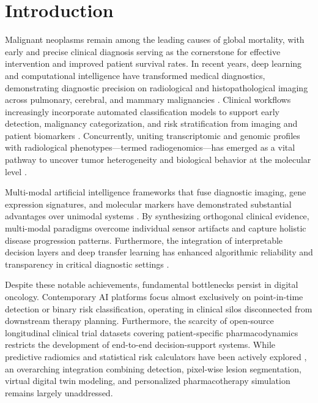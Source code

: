\documentclass[conference]{IEEEtran}
\begin{document}
\section{Introduction}
Malignant neoplasms remain among the leading causes of global mortality, with early and precise clinical diagnosis serving as the cornerstone for effective intervention and improved patient survival rates. In recent years, deep learning and computational intelligence have transformed medical diagnostics, demonstrating diagnostic precision on radiological and histopathological imaging across pulmonary, cerebral, and mammary malignancies \cite{shweikeh2026, uniyal2026, lang2026}. Clinical workflows increasingly incorporate automated classification models to support early detection, malignancy categorization, and risk stratification from imaging and patient biomarkers \cite{yao2025, xu2025, abe2025}. Concurrently, uniting transcriptomic and genomic profiles with radiological phenotypes---termed radiogenomics---has emerged as a vital pathway to uncover tumor heterogeneity and biological behavior at the molecular level \cite{wang2025, oghenekaro2025}.

Multi-modal artificial intelligence frameworks that fuse diagnostic imaging, gene expression signatures, and molecular markers have demonstrated substantial advantages over unimodal systems \cite{slobodzian2025}. By synthesizing orthogonal clinical evidence, multi-modal paradigms overcome individual sensor artifacts and capture holistic disease progression patterns. Furthermore, the integration of interpretable decision layers and deep transfer learning has enhanced algorithmic reliability and transparency in critical diagnostic settings \cite{abbadi2025, wagner2024}.

Despite these notable achievements, fundamental bottlenecks persist in digital oncology. Contemporary AI platforms focus almost exclusively on point-in-time detection or binary risk classification, operating in clinical silos disconnected from downstream therapy planning. Furthermore, the scarcity of open-source longitudinal clinical trial datasets covering patient-specific pharmacodynamics restricts the development of end-to-end decision-support systems. While predictive radiomics and statistical risk calculators have been actively explored \cite{mendes2025, xiao2025}, an overarching integration combining detection, pixel-wise lesion segmentation, virtual digital twin modeling, and personalized pharmacotherapy simulation remains largely unaddressed.
\end{document}
